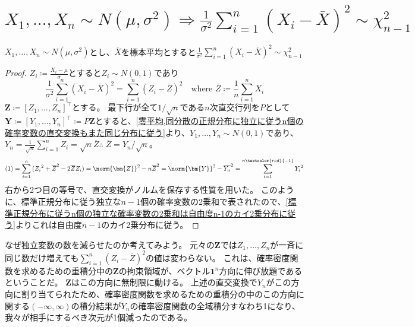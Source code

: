     \section{\texorpdfstring{$X_1,\dotsc,X_n\sim N(\mu,\sigma^2) \Rightarrow \frac{1}{\sigma^2}\sum_{i=1}^n{(X_i-\overline{X})^2} \sim \chi^2_{n-1}$}{X1, ..., Xn ～ N(μ,σ\string^2) ⇒ (1/σ\string^2)[(X1 - sampleAvg(X))\string^2 + ... + (Xn-E(X))\string^2] ～ χ\string^2\_(n-1)}}
        \begin{shadebox}
            $X_1,\dotsc,X_n\sim N(\mu,\sigma^2)$とし、$\overline{X}$を標本平均とすると$\frac{1}{\sigma^2}\sum_{i=1}^n{(X_i-\overline{X})^2} \sim \chi^2_{n-1}$
        \end{shadebox}
        \begin{proof}
            \quad\par
            $Z_i \coloneqq \frac{X_i-\mu}{\sigma}$とすると$Z_i \sim N(0,1)$であり
            \begin{equation}
                \frac{1}{\sigma^2}\sum_{i=1}^n{(X_i-\overline{X})^2} = \sum_{i=1}^n{(Z_i-\overline{Z})^2} \quad \textrm{where }\overline{Z}\coloneqq\frac{1}{n}\sum_{i=1}^n{X_i}
            \end{equation}
            $\bm{Z} \coloneqq [Z_1,\dotsc,Z_n]^\top$とする。
            最下行が全て$1/\sqrt{n}$である$n$次直交行列を$P$として$\bm{Y} \coloneqq [Y_1,\dotsc,Y_n]^\top \coloneqq P\bm{Z}$とすると、\ref{零平均,同分散の正規分布に独立に従うn個の確率変数の直交変換もまた同じ分布に従う}より、$Y_1,\dotsc,Y_n\sim N(0,1)$であり、$Y_n = \frac{1}{\sqrt{n}}\sum_{i=1}^n{Z_i} = \sqrt{n}\overline{Z} \therefore\;\overline{Z}=Y_n/\sqrt{n}$。
            \[(1) = \sum_{i=1}^n{({Z_i}^2 + \overline{Z}^2 -2\overline{Z}Z_i)} = \norm{\bm{Z}}^2 - n\overline{Z}^2 = \norm{\bm{Y}}^2 - \overline{Y_n}^2 = \sum_{i=1}^{n\textcolor{red}{-1}}{{Y_i}^2}\]
            右から2つ目の等号で、直交変換がノルムを保存する性質を用いた。
            このように、標準正規分布に従う独立な$n-1$個の確率変数の2乗和で表されたので、\ref{標準正規分布に従うn個の独立な確率変数の2乗和は自由度n-1のカイ2乗分布に従う}よりこれは自由度$n-1$のカイ2乗分布に従う。
        \end{proof}
        \begin{commentary}
            \quad\par
            なぜ独立変数の数を減らせたのか考えてみよう。
            元々の$\bm{Z}$では$Z_1,\dotsc,Z_n$が一斉に同じ数だけ増えても$\sum_{i=1}^n{(Z_i-\overline{Z})^2}$の値は変わらない。
            これは、確率密度関数を求めるための重積分中の$\bm{Z}$の拘束領域が、ベクトル$\bm{1}^n$方向に伸び放題であるということだ。
            $\bm{Z}$はこの方向に無制限に動ける。
            上述の直交変換で$Y_n$がこの方向に割り当てられたため、確率密度関数を求めるための重積分の中のこの方向に関する$(-\infty,\infty)$の積分結果が$Y_n$の確率密度関数の全域積分すなわち1になり、我々が相手にするべき次元が1個減ったのである。
        \end{commentary}